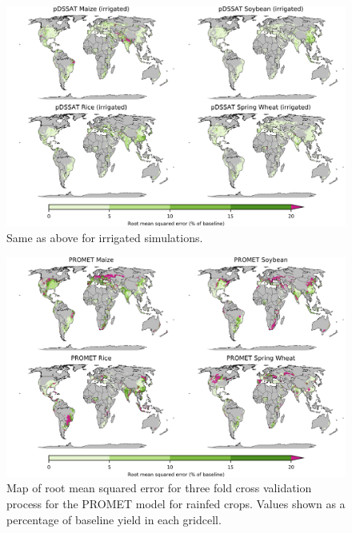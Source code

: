 \documentclass[10pt]{article}
\begin{document}
\begin{figure}[h!]
\centering
\includegraphics[width=15.5cm]{pDSSAT_spatial_MSE_ton_ha_irr.png}
\caption{Same as above for irrigated simulations.}
\label{fig:pdssatrmseirr}
\end{figure}

\begin{figure}[h!]
\centering
\includegraphics[width=15.5cm]{PROMET_spatial_MSE_ton_ha.png}
\caption{Map of root mean squared error for three fold cross validation process for the PROMET model for rainfed crops. Values shown as a percentage of baseline yield in each gridcell.}
\label{fig:pdssatrmse}
\end{figure}
\end{document}
